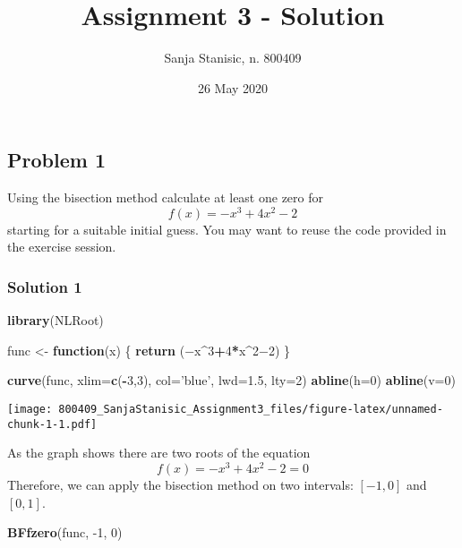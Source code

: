\documentclass[]{article}
\title{Assignment 3 - Solution}
\author{Sanja Stanisic, n. 800409}
\date{26 May 2020}
\newenvironment{Shaded}{\begin{snugshade}}{\end{snugshade}}
\newcommand{\ControlFlowTok}[1]{\textcolor[rgb]{0.13,0.29,0.53}{\textbf{#1}}}
\newcommand{\DataTypeTok}[1]{\textcolor[rgb]{0.13,0.29,0.53}{#1}}
\newcommand{\DecValTok}[1]{\textcolor[rgb]{0.00,0.00,0.81}{#1}}
\newcommand{\FloatTok}[1]{\textcolor[rgb]{0.00,0.00,0.81}{#1}}
\newcommand{\KeywordTok}[1]{\textcolor[rgb]{0.13,0.29,0.53}{\textbf{#1}}}
\newcommand{\NormalTok}[1]{#1}
\newcommand{\OperatorTok}[1]{\textcolor[rgb]{0.81,0.36,0.00}{\textbf{#1}}}
\newcommand{\StringTok}[1]{\textcolor[rgb]{0.31,0.60,0.02}{#1}}
\begin{document}
\maketitle

{
\setcounter{tocdepth}{5}
\tableofcontents
}
\hypertarget{problem-1}{%
\subsection{Problem 1}\label{problem-1}}

Using the bisection method calculate at least one zero for
\[f(x)=−x^3+4x^2−2\] starting for a suitable initial guess. You may want
to reuse the code provided in the exercise session.

\hypertarget{solution-1}{%
\subsubsection{Solution 1}\label{solution-1}}

\begin{Shaded}
\begin{Highlighting}[]
\KeywordTok{library}\NormalTok{(NLRoot)}

\NormalTok{func <-}\StringTok{ }\ControlFlowTok{function}\NormalTok{(x) \{}
  \KeywordTok{return}\NormalTok{ (−x}\OperatorTok{^}\DecValTok{3}\OperatorTok{+}\DecValTok{4}\OperatorTok{*}\NormalTok{x}\OperatorTok{^}\NormalTok{2−}\DecValTok{2}\NormalTok{)}
\NormalTok{\}}

\KeywordTok{curve}\NormalTok{(func, }\DataTypeTok{xlim=}\KeywordTok{c}\NormalTok{(}\OperatorTok{-}\DecValTok{3}\NormalTok{,}\DecValTok{3}\NormalTok{), }\DataTypeTok{col=}\StringTok{'blue'}\NormalTok{, }\DataTypeTok{lwd=}\FloatTok{1.5}\NormalTok{, }\DataTypeTok{lty=}\DecValTok{2}\NormalTok{)}
\KeywordTok{abline}\NormalTok{(}\DataTypeTok{h=}\DecValTok{0}\NormalTok{)}
\KeywordTok{abline}\NormalTok{(}\DataTypeTok{v=}\DecValTok{0}\NormalTok{)}
\end{Highlighting}
\end{Shaded}

\texttt{[image: 800409\_SanjaStanisic\_Assignment3\_files/figure-latex/unnamed-chunk-1-1.pdf]}

As the graph shows there are two roots of the equation
\[f(x)=−x^3+4x^2−2 = 0\] Therefore, we can apply the bisection method on
two intervals: \([-1,0]\) and \([0,1]\).

\begin{Shaded}
\begin{Highlighting}[]
\KeywordTok{BFfzero}\NormalTok{(func, }\DecValTok{-1}\NormalTok{, }\DecValTok{0}\NormalTok{)}
\end{Highlighting}
\end{Shaded}
\end{document}
